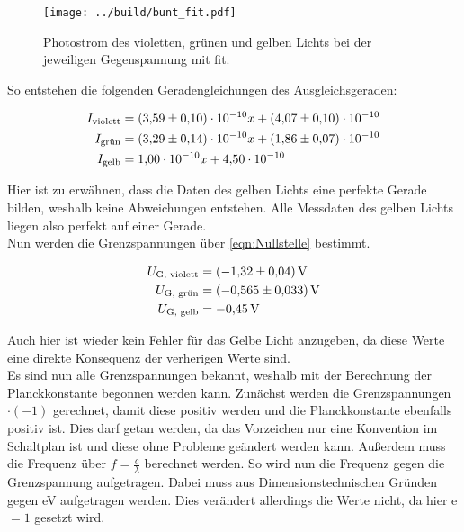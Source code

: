 \begin{figure}[H]
    \centering
    \texttt{[image: ../build/bunt\_fit.pdf]}
    \caption{Photostrom des violetten, grünen und gelben Lichts bei der jeweiligen Gegenspannung mit fit.}
\end{figure}

\noindent So entstehen die folgenden Geradengleichungen des Ausgleichsgeraden:

\begin{align*}
    I_\text{violett} &= \num {3.59\pm0.10e-10} x + \num{4.07\pm0.10e-10}\\
    I_\text{grün}    &= \num {3.29\pm0.14e-10} x + \num{1.86\pm0.07e-10}\\
    I_\text{gelb}    &= \num {1.00\pm0.00e-10} x + \num{4.50\pm0.00e-10}\\
\end{align*}

\noindent Hier ist zu erwähnen, dass die Daten des gelben Lichts eine perfekte Gerade bilden, weshalb keine Abweichungen entstehen. 
Alle Messdaten des gelben Lichts liegen also perfekt auf einer Gerade. \\
\noindent Nun werden die Grenzspannungen über \autoref{eqn:Nullstelle} bestimmt.

\begin{align}
    U_\text{G, violett} &= \qty{-1.32 \pm 0.04}{\volt}\\
    U_\text{G, grün} &= \qty{-0.565 \pm 0.033}{\volt}\\
    U_\text{G, gelb} &= \qty{-0.45 \pm 0.00}{\volt}
\end{align}

\noindent Auch hier ist wieder kein Fehler für das Gelbe Licht anzugeben, da diese Werte eine direkte Konsequenz der verherigen Werte sind.\\
\noindent Es sind nun alle Grenzspannungen bekannt, weshalb mit der Berechnung der Planckkonstante begonnen werden kann. Zunächst werden die 
Grenzspannungen $\cdot (-1)$ gerechnet, damit diese positiv werden und die Planckkonstante ebenfalls positiv ist. Dies darf getan werden, da 
das Vorzeichen nur eine Konvention im Schaltplan ist und diese ohne Probleme geändert werden kann. Außerdem muss die Frequenz über 
$f=\frac{c}{\lambda}$ berechnet werden. So wird nun die Frequenz gegen die Grenzspannung aufgetragen. Dabei muss aus Dimensionstechnischen 
Gründen gegen eV aufgetragen werden. Dies verändert allerdings die Werte nicht, da hier e$=1$ gesetzt wird. 

